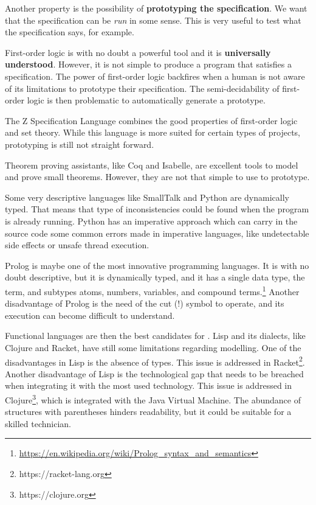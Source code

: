 Another property is the possibility of \textbf{prototyping the specification}.
We want that the specification can be \textit{run} in some sense.
This is very useful to test what the specification says, for example.

First-order logic is with no doubt a powerful tool and it is \textbf{universally understood}.
However, it is not simple to produce a program that satisfies a specification.
The power of first-order logic backfires when a human is not aware of its limitations to prototype their specification.
The semi-decidability of first-order logic is then problematic to automatically generate a prototype.

The Z Specification Language combines the good properties of first-order logic and set theory.
While this language is more suited for certain types of projects, prototyping is still not straight forward.

Theorem proving assistants, like Coq and Isabelle, are excellent tools to model and prove small theorems.
However, they are not that simple to use to prototype.

Some very descriptive languages like SmallTalk and Python are dynamically typed.
That means that type of inconsistencies could be found when the program is already running.
Python has an imperative approach which can carry in the source code some common errors made in imperative languages, like undetectable side effects or unsafe thread execution.

Prolog is maybe one of the most innovative programming languages.
It is with no doubt descriptive, but it is dynamically typed, and it has a single data type, the term, and subtypes atoms, numbers, variables, and compound terms.\footnote{\url{https://en.wikipedia.org/wiki/Prolog_syntax_and_semantics}}
Another disadvantage of Prolog is the need of the cut (!) symbol to operate, and its execution can become difficult to understand.

Functional languages are then the best candidates for \Soda.
Lisp and its dialects, like Clojure and Racket, have still some limitations regarding modelling.
One of the disadvantages in Lisp is the absence of types.
This issue is addressed in Racket\footnote{https://racket-lang.org}.
Another disadvantage of Lisp is the technological gap that needs to be breached when integrating it with the most used technology.
This issue is addressed in Clojure\footnote{https://clojure.org}, which is integrated with the Java Virtual Machine.
The abundance of structures with parentheses hinders readability, but it could be suitable for a skilled technician.


